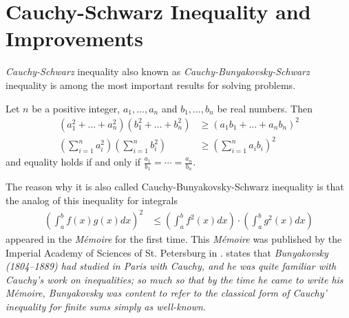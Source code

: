 \documentclass{subfile}
\begin{document}
	\section[Cauchy-Schwarz]{Cauchy-Schwarz Inequality and Improvements}\label{sec:cs}
	\textit{Cauchy-Schwarz} inequality also known as \textit{Cauchy-Bunyakovsky-Schwarz} inequality is among the most important results for solving problems.
		\begin{theorem}\label{thm:cs}
			Let $n$ be a positive integer, $a_1,\ldots,a_n$ and $b_1,\ldots,b_n$ be real numbers. Then
				\begin{align}
					(a_{1}^{2}+\ldots+a_{n}^{2})(b_{1}^{2}+\ldots+b_{n}^{2})
						& \geq(a_{1}b_{1}+\ldots+a_{n}b_{n})^2\label{ineq:cs}\\
					\left(\sum_{i=1}^{n}a_{i}^{2}\right)\left(\sum_{i=1}^nb_i^2\right)
						& \geq\left(\sum_{i=1}^na_ib_i\right)^2\nonumber
				\end{align}
			and equality holds if and only if $\frac{a_1}{b_1}=\cdots=\frac{a_n}{b_n}$.
		\end{theorem}
	The reason why it is also called Cauchy-Bunyakovsky-Schwarz inequality is that the analog of this inequality for integrals
		\begin{align}
			\left(\int_{a}^{b}f(x)g(x)dx\right)^2
				& \leq\left(\int_{a}^{b}f^2(x)dx\right)\cdot\left(\int_{a}^{b}g^2(x)dx\right)\label{ineq:cbs}
		\end{align}
	appeared in the \textit{M\'{e}moire} \textcite[Page $4$]{bunyakovsky_1846} for the first time. This \textit{M\'{e}moire} was published by the Imperial Academy of Sciences of St. Petersburg in \textcite{bouniakowsky_1859}. \textcite[Page $10$]{steele_2010} states that \textit{Bunyakovsky (1804–1889) had studied in Paris with Cauchy, and he was quite familiar with Cauchy’s work on inequalities; so much so that by the time he came to write his M\'{e}moire, Bunyakovsky was content to refer to the classical form of Cauchy’ inequality for finite sums simply as well-known.}
\end{document}
